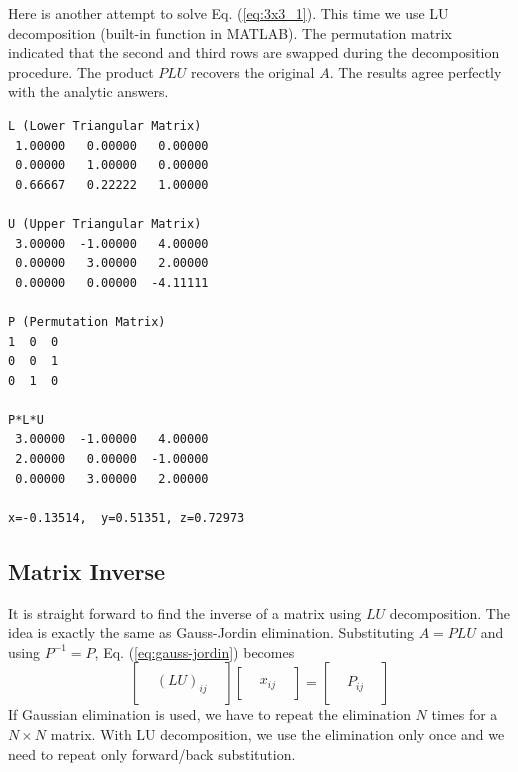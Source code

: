 \bigskip
\begin{example}\label{ex:LU}

Here is another attempt to solve Eq. (\ref{eq:3x3_1}).  This time we use LU decomposition (built-in function in MATLAB). 
The permutation matrix indicated that the second and third rows are swapped during the decomposition procedure. The product $PLU$ recovers the original $A$. The results agree perfectly with the analytic answers.
\end{example}

\begin{mybox}

\small
\begin{verbatim}
L (Lower Triangular Matrix)
 1.00000   0.00000   0.00000
 0.00000   1.00000   0.00000
 0.66667   0.22222   1.00000

U (Upper Triangular Matrix)
 3.00000  -1.00000   4.00000
 0.00000   3.00000   2.00000
 0.00000   0.00000  -4.11111

P (Permutation Matrix)
1  0  0
0  0  1
0  1  0

P*L*U
 3.00000  -1.00000   4.00000
 2.00000   0.00000  -1.00000
 0.00000   3.00000   2.00000

x=-0.13514,  y=0.51351, z=0.72973
\end{verbatim}
\normalsize
\end{mybox}

\noindent
\subsection{Matrix Inverse}

It is straight forward to find the inverse of a matrix using $LU$ decomposition. The idea is exactly the same as Gauss-Jordin elimination.  Substituting $A=PLU$ and using $P^{-1}=P$, Eq. (\ref{eq:gauss-jordin}) becomes
\begin{equation}\label{eq:lu_inv}
\begin{bmatrix}  & & \\  & (LU)_{ij} & \\  & &  \end{bmatrix} 
\begin{bmatrix}  & & \\  & x_{ij} & \\  & &  \end{bmatrix} 
=
\begin{bmatrix}  & & \\  & P_{ij} & \\  & &  \end{bmatrix} 
\end{equation}
If Gaussian elimination is used, we have to repeat the elimination $N$ times for a $N \times N$ matrix.  With LU decomposition, we use the elimination only once and we need to repeat only forward/back substitution.


